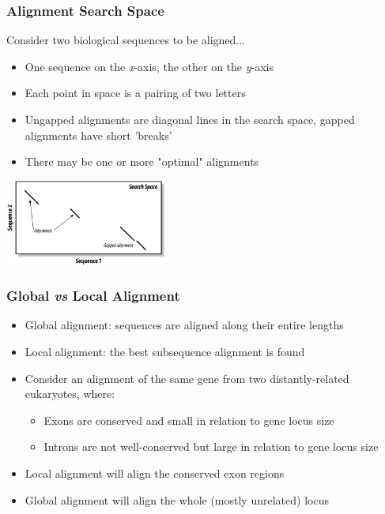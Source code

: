 \documentclass[table]{beamer}
\begin{document}
    \begin{frame}
     \frametitle{Alignment Search Space}
     Consider two biological sequences to be aligned$\ldots$
     \begin{itemize}
       \item One sequence on the \textit{x}-axis, the other on the \textit{y}-axis
       \item Each point in space is a pairing of two letters
       \item Ungapped alignments are diagonal lines in the search space, gapped alignments have short 'breaks'
       \item There may be one or more "optimal" alignments
     \end{itemize}
     \begin{center}
       \includegraphics[width=0.4\textwidth]{images/search_space} 
     \end{center}
   \end{frame}
    
    \begin{frame}
     \frametitle{Global \textit{vs} Local Alignment}
     \begin{itemize}
       \item<1-> Global alignment: sequences are aligned along their entire lengths
       \item<1-> Local alignment: the best subsequence alignment is found
       \item<2-> Consider an alignment of the same gene from two distantly-related eukaryotes, where:
         \begin{itemize}
           \item<2-> Exons are conserved and small in relation to gene locus size
           \item<2-> Introns are not well-conserved but large in relation to gene locus size
         \end{itemize}
       \item<2-> Local alignment will align the conserved exon regions
       \item<2-> Global alignment will align the whole (mostly unrelated) locus
     \end{itemize}
    \end{frame}
\end{document}
